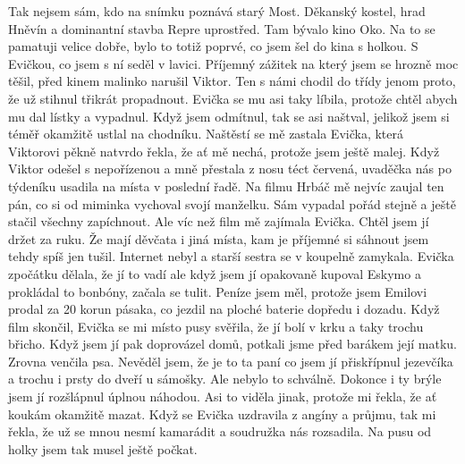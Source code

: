 
Tak nejsem sám, kdo na snímku poznává starý Most. Děkanský kostel,
hrad Hněvín a dominantní stavba Repre uprostřed. Tam bývalo kino Oko.
Na to se pamatuji velice dobře, bylo to totiž poprvé, co jsem šel do
kina s holkou. S Evičkou, co jsem s ní seděl v lavici. Příjemný
zážitek na který jsem se hrozně moc těšil, před kinem malinko narušil
Viktor. Ten s námi chodil do třídy jenom proto, že už stihnul třikrát
propadnout. Evička se mu asi taky líbila, protože chtěl abych mu dal
lístky a vypadnul. Když jsem odmítnul, tak se asi naštval, jelikož
jsem si téměř okamžitě ustlal na chodníku. Naštěstí se mě zastala
Evička, která Viktorovi pěkně natvrdo řekla, že ať mě nechá, protože
jsem ještě malej. Když Viktor odešel s nepořízenou a mně přestala z
nosu téct červená, uvaděčka nás po týdeníku usadila na místa v
poslední řadě. Na filmu Hrbáč mě nejvíc zaujal ten pán, co si od
miminka vychoval svojí manželku. Sám vypadal pořád stejně a ještě
stačil všechny zapíchnout. Ale víc než film mě zajímala Evička. Chtěl
jsem jí držet za ruku. Že mají děvčata i jiná místa, kam je příjemné
si sáhnout jsem tehdy spíš jen tušil. Internet nebyl a starší sestra
se v koupelně zamykala. Evička zpočátku dělala, že jí to vadí ale když
jsem jí opakovaně kupoval Eskymo a prokládal to bonbóny, začala se
tulit. Peníze jsem měl, protože jsem Emilovi prodal za 20 korun
pásaka, co jezdil na ploché baterie dopředu i dozadu. Když film
skončil, Evička se mi místo pusy svěřila, že jí bolí v krku a taky
trochu břicho. Když jsem jí pak doprovázel domů, potkali jsme před
barákem její matku. Zrovna venčila psa. Nevěděl jsem, že je to ta paní
co jsem jí přiskřípnul jezevčíka a trochu i prsty do dveří u sámošky.
Ale nebylo to schválně. Dokonce i ty brýle jsem jí rozšlápnul úplnou
náhodou. Asi to viděla jinak, protože mi řekla, že ať koukám okamžitě
mazat. Když se Evička uzdravila z angíny a průjmu, tak mi řekla, že už
se mnou nesmí kamarádit a soudružka nás rozsadila. Na pusu od holky
jsem tak musel ještě počkat.
